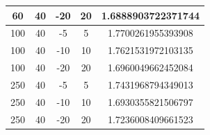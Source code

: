 \documentclass[letterpaper]{report}
\begin{document}
\begin{table}[ht!]
\begin{center}
\begin{tabular}{|c|c|c|c|c|}
          \hline
          \rowcolor[HTML]{CCEEBB}
          60 & 40 & -20 & 20 & \cellcolor[HTML]{00AB67} 1.6888903722371744 \\
          \hline
          100 & 40 & -5 & 5 & 1.7700261955393908 \\
          \hline
          100 & 40 & -10 & 10 & 1.7621531972103135 \\
          \hline
          \rowcolor[HTML]{CCEEBB}
          100 & 40 & -20 & 20 & 1.6960049662452084 \\
          \hline
          250 & 40 & -5 & 5 & 1.7431968794349013 \\
          \hline
          \rowcolor[HTML]{CCEEBB}
          250 & 40 & -10 & 10 & 1.6930355821506797 \\
          \hline
          250 & 40 & -20 & 20 & 1.7236008409661523 \\
          \hline
        \end{tabular}
        \label{table:params-results}
      \end{center}
    \end{table}

\end{document}
